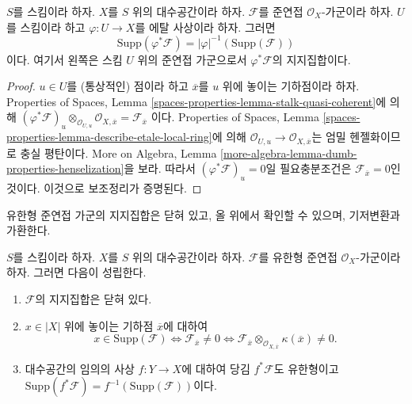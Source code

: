 \begin{lemma}
\label{lemma-support-covering}
$S$를 스킴이라 하자. $X$를 $S$ 위의 대수공간이라 하자.
$\mathcal{F}$를 준연접 $\mathcal{O}_X$-가군이라 하자.
$U$를 스킴이라 하고 $\varphi : U \to X$를 에탈 사상이라 하자.
그러면
$$
\text{Supp}(\varphi^*\mathcal{F}) = |\varphi|^{-1}(\text{Supp}(\mathcal{F}))
$$
이다. 여기서 왼쪽은 스킴 $U$ 위의 준연접 가군으로서
$\varphi^*\mathcal{F}$의 지지집합이다.
\end{lemma}

\begin{proof}
$u\in U$를 (통상적인) 점이라 하고 $\overline{x}$를 $u$ 위에 놓이는
기하점이라 하자. Properties of Spaces, Lemma
\ref{spaces-properties-lemma-stalk-quasi-coherent}에 의해
$(\varphi^*\mathcal{F})_u \otimes_{\mathcal{O}_{U, u}}
\mathcal{O}_{X, \overline{x}} = \mathcal{F}_{\overline{x}}$
이다. Properties of Spaces, Lemma
\ref{spaces-properties-lemma-describe-etale-local-ring}에 의해
$\mathcal{O}_{U, u} \to \mathcal{O}_{X, \overline{x}}$는
엄밀 헨젤화이므로 충실 평탄이다. More on Algebra, Lemma
\ref{more-algebra-lemma-dumb-properties-henselization}을 보라.
따라서 $(\varphi^*\mathcal{F})_u = 0$일 필요충분조건은
$\mathcal{F}_{\overline{x}} = 0$인 것이다. 이것으로 보조정리가
증명된다.
\end{proof}

\noindent
유한형 준연접 가군의 지지집합은 닫혀 있고, 올 위에서 확인할 수
있으며, 기저변환과 가환한다.

\begin{lemma}
\label{lemma-support-finite-type}
$S$를 스킴이라 하자. $X$를 $S$ 위의 대수공간이라 하자.
$\mathcal{F}$를 유한형 준연접 $\mathcal{O}_X$-가군이라 하자.
그러면 다음이 성립한다.
\begin{enumerate}
\item $\mathcal{F}$의 지지집합은 닫혀 있다.
\item $x \in |X|$ 위에 놓이는 기하점 $\overline{x}$에 대하여
$$
x \in \text{Supp}(\mathcal{F})
\Leftrightarrow
\mathcal{F}_{\overline{x}} \not = 0
\Leftrightarrow
\mathcal{F}_{\overline{x}} \otimes_{\mathcal{O}_{X, \overline{x}}}
\kappa(\overline{x}) \not = 0.
$$
\item 대수공간의 임의의 사상 $f : Y \to X$에 대하여 당김
$f^*\mathcal{F}$도 유한형이고
$\text{Supp}(f^*\mathcal{F}) = f^{-1}(\text{Supp}(\mathcal{F}))$이다.
\end{enumerate}
\end{lemma}

